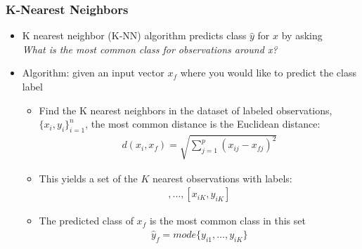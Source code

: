 \documentclass[
  shownotes,
  xcolor={svgnames},
  hyperref={colorlinks,citecolor=DarkBlue,linkcolor=andesred,urlcolor=DarkBlue}
  , aspectratio=169]{beamer}
\begin{document}
\begin{frame}[fragile]
\frametitle{K-Nearest Neighbors}

\begin{itemize}
\item K nearest neighbor (K-NN) algorithm predicts class $\hat y$ for $x$ by asking \\
{\it What is the most common class for observations around x?}
\item Algorithm: given an input vector $x_f$ where you would like to predict the class label

\begin{itemize}
  \item Find the K nearest neighbors in the dataset of labeled observations, $\{x_i,y_i\}_{i=1}^n$, the most common distance is the Euclidean distance:
  \begin{align}
  d(x_i,x_f)=\sqrt{\sum_{j=1}^p(x_{ij}-x_{fj})^2}
  \end{align}
  \item This yields a set of the $K$ nearest observations with labels: 
  \begin{align}
  [x_{i1},y_{i1}],\dots,[x_{iK},y_{iK}]
  \end{align}
  \item The predicted class of $x_f$ is the most common class in this set
  \begin{align}
  \hat{y}_f =mode\{y_{i1},\dots,y_{iK}\}
  \end{align}
\end{itemize}

\end{itemize}
\end{frame}
\end{document}
